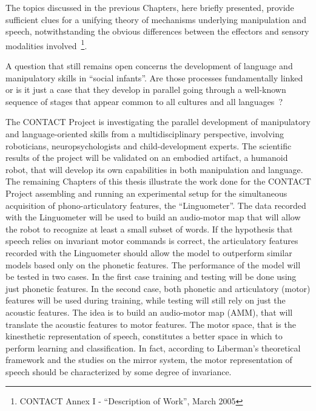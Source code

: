 The topics discussed in the previous Chapters, here briefly presented, provide
sufficient clues for a unifying theory of mechanisms underlying
manipulation and speech, notwithstanding the obvious differences between the
effectors and sensory modalities
involved~\footnote{CONTACT Annex I - ``Description of Work'', March 2005}.

A question that still remains open concerns the development of language
and manipulatory skills in ``social infants''.
Are those processes fundamentally linked or is it just a case that they develop
in parallel going through a well-known sequence of 
stages that appear common to all cultures and all
languages~\citep{lennenberg:1967}?

The CONTACT Project is investigating the parallel development of manipulatory
and language-oriented skills from a multidisciplinary perspective, involving
roboticians, neuropsychologists and child-development experts.
The scientific results of the project will be validated on an embodied artifact,
a humanoid robot, that will develop its own capabilities in both manipulation
and language.
The remaining Chapters of this thesis illustrate the work done for the CONTACT
Project assembling and running an experimental setup for the simultaneous 
acquisition of phono-articulatory features, the ``Linguometer''.
The data recorded with the Linguometer will be used to build an audio-motor map 
that will allow the robot to recognize at least a small subset of words.
If the hypothesis that speech relies on invariant motor commands is correct, 
the articulatory features recorded with the Linguometer should allow the
model to outperform similar models based only on the phonetic features.
The performance of the model will be tested in two cases.
In the first case training and testing will be done using just phonetic
features. In the second case, both phonetic and articulatory (motor) features
will be used during training, while testing will still rely on just the acoustic
features.
The idea is to build an audio-motor map (AMM), that will translate the acoustic 
features to motor features. 
The motor space, that is the kinesthetic representation of speech, constitutes
a better space in which to perform learning and classification.
In fact, according to Liberman's theoretical framework and the
studies on the mirror system, the motor representation of speech should be 
characterized by some degree of invariance.

